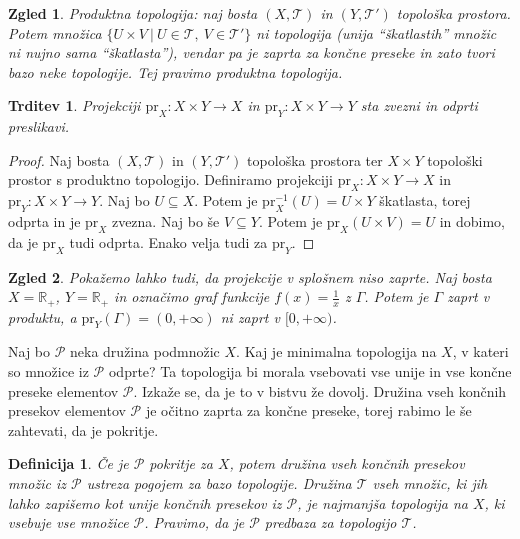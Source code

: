 \documentclass[10pt, a4paper]{article}
\newtheorem{trditev}[izr]{Trditev}
\newtheorem{defi}{Definicija}[section]
\newenvironment{noticeB}{%
  \tcolorbox[%
  notitle,
  empty,
  enhanced,  %
  breakable,
  coltext=black,
  colback=white, 
  fontupper=\rmfamily,
  parbox=false,
  noparskip,
  sharp corners,
  boxrule=-1pt,  %
  frame hidden,
  left=7pt,  %
  right=7pt,
  top=5pt,
  bottom=5pt,
  before skip=2.5ex plus 2pt,
  after skip=2.5ex plus 2pt,
  borderline west = {1.5pt}{-0.1pt}{blue!30!black}, %
  overlay unbroken and last={%
    \draw[color=black, line width=1.25pt]
    ($(frame.south west)+(1.pt, -0.1pt)$) -- ++(2em, 0);
  }
  ]}
{\endtcolorbox}
\newenvironment{definicija}{\begin{noticeB}\begin{defi}}{%
    \end{defi}\end{noticeB}}
\newtheorem{zgled}{Zgled}[section]
\newenvironment{noticeC}{%
  \tcolorbox[%
  notitle,
  empty,
  enhanced,  %
  breakable,
  coltext=black, 
  fontupper=\rmfamily,
  parbox=false,
  noparskip,
  sharp corners,
  boxrule=-1pt,  %
  frame hidden,
  left=7pt,  %
  right=7pt,
  top=5pt,
  bottom=5pt,
  before skip=2.5ex plus 2pt,
  after skip=2.5ex plus 2pt,
  overlay unbroken and last={%
  },
  ]}
{\endtcolorbox}
\newenvironment{dokaz}%
  {\begin{noticeC}\begin{proof}}%
  {\end{proof}\end{noticeC}}
\newcommand{\R}{\mathbb {R}}
\newcommand{\topo}[1]{\mathcal{#1}}
\begin{document}
\begin{zgled}
  Produktna topologija: naj bosta $(X, \mathcal{T})$ in $(Y, \mathcal{T}')$ topološka prostora.
  Potem množica $\{U \times V\ |\ U \in \mathcal{T},\ V \in \mathcal{T}'\}$ ni topologija (unija "`škatlastih"' množic ni nujno sama "`škatlasta"'),
  vendar pa je zaprta za končne preseke in zato tvori bazo neke topologije.
  Tej pravimo produktna topologija.
\end{zgled}

\begin{trditev}
  Projekciji $\mathrm{pr}_X: X \times Y \to X$ in $\mathrm{pr}_Y : X \times Y \to Y$ sta zvezni in odprti preslikavi.
\end{trditev}

\begin{dokaz}
  Naj bosta $(X, \mathcal{T})$ in $(Y, \mathcal{T}')$
  topološka prostora ter $X \times Y$ topološki prostor s produktno topologijo. Definiramo projekciji $\mathrm{pr}_X : X \times Y \to X$ in $\mathrm{pr}_Y : X \times Y \to Y$.
  Naj bo $U \subseteq X$. Potem je $\mathrm{pr}_X ^{-1} (U) = U \times Y$ škatlasta, torej odprta in je $\mathrm{pr}_X$ zvezna.
  Naj bo še $V \subseteq Y$. Potem je $\mathrm{pr}_X (U \times V) = U$ in dobimo, da je $\mathrm{pr}_X$ tudi odprta.
  Enako velja tudi za $\mathrm{pr}_Y$.
\end{dokaz}

\begin{zgled}
  Pokažemo lahko tudi, da projekcije v splošnem niso zaprte.
  Naj bosta $X = \R_+$, $Y = \R_+$ in označimo graf funkcije $f(x) = \frac{1}{x}$ z $\Gamma$.
  Potem je $\Gamma$ zaprt v produktu, a $\mathrm{pr}_Y (\Gamma) = (0, +\infty)$ ni zaprt v $[0, +\infty)$.
\end{zgled}

Naj bo $\mathcal{P}$ neka družina podmnožic $X$.
Kaj je minimalna topologija na $X$, v kateri so množice iz $\mathcal{P}$ odprte?
Ta topologija bi morala vsebovati vse unije in vse končne preseke elementov $\mathcal{P}$.
Izkaže se, da je to v bistvu že dovolj. Družina vseh končnih presekov elementov $\mathcal{P}$
je očitno zaprta za končne preseke, torej rabimo le še zahtevati, da je pokritje.

\begin{definicija}
  Če je $\topo{P}$ pokritje za $X$, potem družina vseh končnih presekov množic iz $\mathcal{P}$
  ustreza pogojem za bazo topologije. Družina $\mathcal{T}$ vseh množic, ki jih lahko zapišemo kot unije končnih presekov
  iz $\topo{P}$, je najmanjša topologija na $X$, ki vsebuje vse množice $\topo{P}$.
  Pravimo, da je $\topo{P}$ predbaza za topologijo $\topo{T}$.
\end{definicija}
\end{document}
